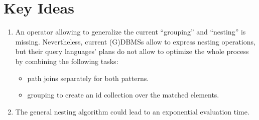 \section{Key Ideas}
\begin{lucido}
	\begin{enumerate}
		[square]
		\item  An operator allowing to generalize the current ``grouping'' and ``nesting'' is missing. Nevertheless, current (G)DBMSs allow to express nesting operations, but their query languages' plans do not allow to optimize the whole process by combining the following tasks:
		\begin{itemize}
			\item \alert{path joins} separately for both patterns.
			\item \alert{grouping} to create an id collection over the matched elements.
		\end{itemize}
		\item The general nesting algorithm could lead to an exponential evaluation time.
	\end{enumerate}
\end{lucido}

